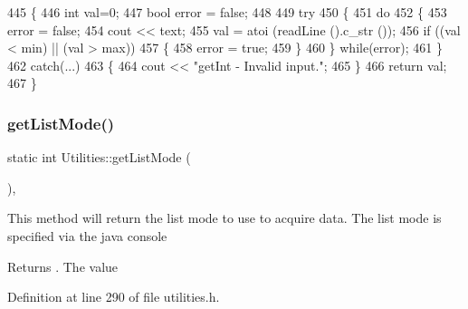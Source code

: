 \begin{DoxyCode}
445     \{
446         \textcolor{keywordtype}{int} val=0;
447         \textcolor{keywordtype}{bool} error = \textcolor{keyword}{false};
448         
449         \textcolor{keywordflow}{try} 
450         \{
451             \textcolor{keywordflow}{do} 
452             \{
453                 error = \textcolor{keyword}{false};
454                 cout << text;
455                 val = atoi (readLine ().c\_str ());
456                 \textcolor{keywordflow}{if} ((val < min) || (val > max)) 
457                 \{
458                     error = \textcolor{keyword}{true};
459                 \}
460             \} \textcolor{keywordflow}{while}(error);
461         \}
462         \textcolor{keywordflow}{catch}(...) 
463         \{
464             cout << \textcolor{stringliteral}{"getInt - Invalid input."};
465         \}
466         \textcolor{keywordflow}{return} val;
467     \}
\end{DoxyCode}
\mbox{\label{class_utilities_a399c7018566d21e1f0f6c0b9698e0169_a399c7018566d21e1f0f6c0b9698e0169}} 
\subsubsection{\texorpdfstring{get\+List\+Mode()}{getListMode()}}
{\footnotesize\ttfamily static int Utilities\+::get\+List\+Mode (\begin{DoxyParamCaption}{ }\end{DoxyParamCaption})\hspace{0.3cm}{\ttfamily [inline]}, {\ttfamily [static]}}

This method will return the list mode to use to acquire data. The list mode is specified via the java console

\begin{DoxyReturn}{Returns}
. The value 
\end{DoxyReturn}


Definition at line 290 of file utilities.\+h.


